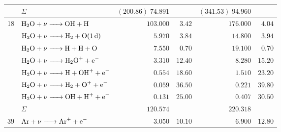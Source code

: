 \documentclass[a4paper, 10pt]{article}
\begin{document}
\begin{table}
\begin{tabularx}{0.99\textwidth}{ll RRRR}
		 & $\Sigma$ &$(\num{200.86})\;\num{74.891}$& &$(\num{341.53})\;\num{94.960}$& \\
		 & $\ce{H2O +$\nu$ -> OH + H}$ & $\num{103.000}$ & $\num{3.42}$ & $\num{176.000}$ & $\num{4.04}$ \\
		 & $\ce{H2O +$\nu$ -> H2 + O(1d)}$ & $\num{5.970}$ & $\num{3.84}$ & $\num{14.800}$ & $\num{3.94}$ \\
		 & $\ce{H2O +$\nu$ -> H + H + O}$ & $\num{7.550}$ & $\num{0.70}$ & $\num{19.100}$ & $\num{0.70}$ \\
		 & $\ce{H2O +$\nu$ -> H2O+ + e-}$ & $\num{3.310}$ & $\num{12.40}$ & $\num{8.280}$ & $\num{15.20}$ \\
		 & $\ce{H2O +$\nu$ -> H + OH+ + e-}$ & $\num{0.554}$ & $\num{18.60}$ & $\num{1.510}$ & $\num{23.20}$ \\
		 & $\ce{H2O +$\nu$ -> H2 + O+ + e-}$ & $\num{0.059}$ & $\num{36.50}$ & $\num{0.221}$ & $\num{39.80}$ \\
		 & $\ce{H2O +$\nu$ -> OH + H+ + e-}$ & $\num{0.131}$ & $\num{25.00}$ & $\num{0.407}$ & $\num{30.50}$ \\
		 & $\Sigma$ & $\num{120.574}$ & & $\num{220.318}$ & \\
		 & $\ce{Ar +$\nu$ -> Ar+ + e-}$ & $\num{3.050}$ & $\num{10.10}$ & $\num{6.900}$ & $\num{12.80}$ \\
		\bottomrule
	\end{tabularx}
	\label{tab:photorates_HUEBNER1992}
\end{table}
\end{document}
